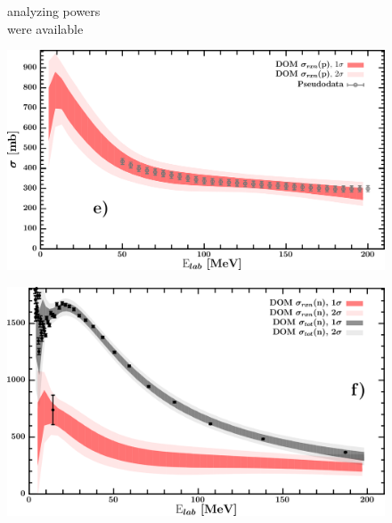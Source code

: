 \documentclass[twocolumn,secnumarabic,amssymb, nobibnotes, aps, prl,
superscriptaddress, nobalancelastpage, draft]{revtex4}
\begin{document}
\begin{figure}[!htb]
\begin{minipage}{0.4\linewidth}
\begin{minipage}[c]{0.45\linewidth}
            analyzing powers\\
            were available
        \end{minipage}
        \label{DOM_o18_neutron_elastic}
    \end{minipage}
    \centering
    \begin{minipage}{0.4\linewidth}
        \centering
        \includegraphics[width=\linewidth]{figures/o18_protonInelastic.png}
        \label{DOM_o18_proton_inelastic}
    \end{minipage}\hspace{6pt}
    \begin{minipage}{0.4\linewidth}
        \centering
        \includegraphics[width=\linewidth]{figures/o18_neutronInelastic.png}
        \label{DOM_o18_neutron_inelastic}
    \end{minipage}
    \centering
    \begin{minipage}{0.4\linewidth}
        \centering

\end{minipage}
\end{figure}
\end{document}
